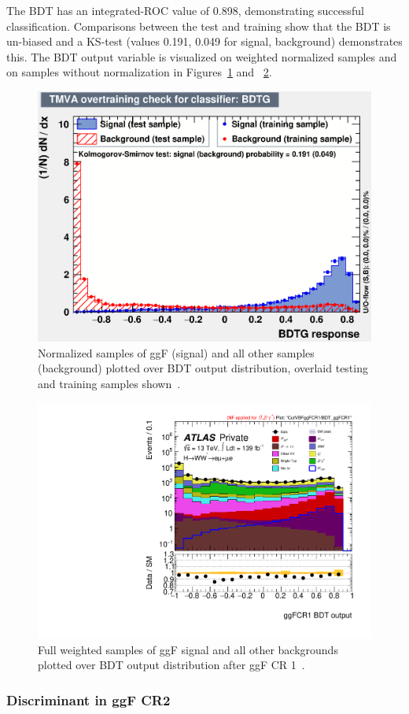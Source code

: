 The BDT has an integrated-ROC value of 0.898, demonstrating successful classification. Comparisons between the test and training show that the BDT is un-biased and a KS-test (values 0.191, 0.049 for signal, background) demonstrates this. The BDT output variable is visualized on weighted normalized samples and on samples without normalization in Figures~\ref{fig:ggFCR1BDTresult} and ~\ref{fig:ggFCR1BDTresult2}.

\begin{figure}[!htbp]
\centering
  \includegraphics[width=.45\linewidth]{Pictures/ggFCR1/overtrain_BDTG.eps}
\caption{Normalized samples of ggF (signal) and all other samples (background) plotted over BDT output distribution, overlaid testing and training samples shown~\cite{ourSupportNote}.}
\label{fig:ggFCR1BDTresult}
\end{figure}

\begin{figure}[!htbp]
\centering
  \includegraphics[width=.45\linewidth]{Pictures/run2-emme-CutVBFggFCR1-BDT_ggFCR1-log.pdf}
\caption{Full weighted samples of ggF signal and all other backgrounds plotted over BDT output distribution after ggF CR 1~\cite{ourSupportNote}.}
\label{fig:ggFCR1BDTresult2}
\end{figure}

\newpage
\subsubsection{Discriminant in ggF CR2}

